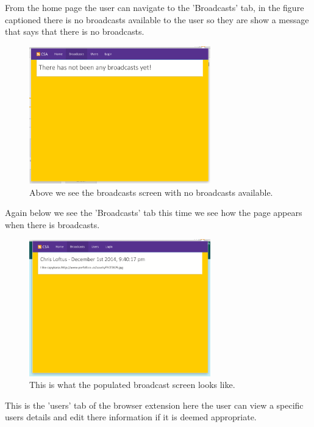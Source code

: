 \documentclass{article}
\begin{document}
\newpage
From the home page the user can navigate to the 'Broadcasts' tab, in the figure captioned there is no broadcasts available to the user so they are show a message that says that there is no broadcasts.\\

\begin{figure}[H]
\centering
\includegraphics[width=0.7\textwidth]{bcpage}
\caption{Above we see the broadcasts screen with no broadcasts available.}
\end{figure}

Again below we see the 'Broadcasts' tab this time we see how the page appears when there is broadcasts.

\begin{figure}[H]
\centering
\includegraphics[width=0.7\textwidth]{populatebcpage}
\caption{This is what the populated broadcast screen looks like.}
\end{figure}

This is the 'users' tab of the browser extension here the user can view a specific users details and edit there information if it is deemed appropriate.
\end{document}
